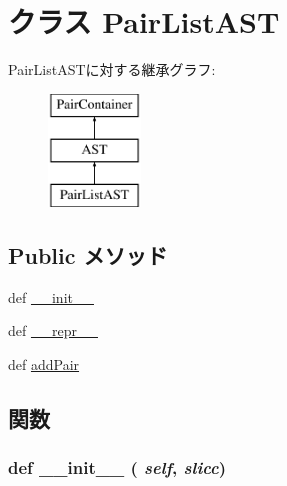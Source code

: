 \hypertarget{classslicc_1_1ast_1_1PairListAST_1_1PairListAST}{
\section{クラス PairListAST}
\label{classslicc_1_1ast_1_1PairListAST_1_1PairListAST}
}
PairListASTに対する継承グラフ:\begin{figure}[H]
\begin{center}
\leavevmode
\includegraphics[height=3cm]{classslicc_1_1ast_1_1PairListAST_1_1PairListAST}
\end{center}
\end{figure}
\subsection*{Public メソッド}
\begin{DoxyCompactItemize}
\item 
def \hyperlink{classslicc_1_1ast_1_1PairListAST_1_1PairListAST_ac775ee34451fdfa742b318538164070e}{\_\-\_\-init\_\-\_\-}
\item 
def \hyperlink{classslicc_1_1ast_1_1PairListAST_1_1PairListAST_ad8b9328939df072e4740cd9a63189744}{\_\-\_\-repr\_\-\_\-}
\item 
def \hyperlink{classslicc_1_1ast_1_1PairListAST_1_1PairListAST_a94e451632bd634a87d2a5ba5a4658b76}{addPair}
\end{DoxyCompactItemize}


\subsection{関数}
\hypertarget{classslicc_1_1ast_1_1PairListAST_1_1PairListAST_ac775ee34451fdfa742b318538164070e}{
\subsubsection[{\_\-\_\-init\_\-\_\-}]{\setlength{\rightskip}{0pt plus 5cm}def \_\-\_\-init\_\-\_\- ( {\em self}, \/   {\em slicc})}}
\label{classslicc_1_1ast_1_1PairListAST_1_1PairListAST_ac775ee34451fdfa742b318538164070e}


